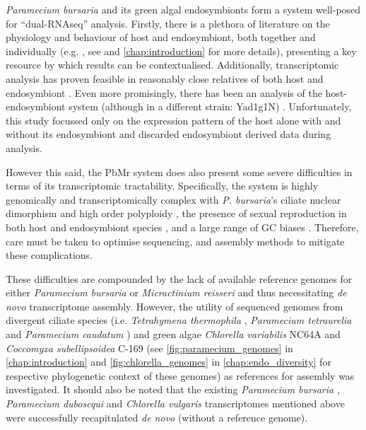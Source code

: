 \textit{Paramecium bursaria} and its green algal endosymbionts form a system well-posed
for ``dual-RNAseq'' analysis.  Firstly, there is a plethora 
of literature on the physiology and behaviour of host and endosymbiont, both together and individually
(e.g. \citep{Iwatsuki1988}, see \citep{Kato2009a} and \ref{chap:introduction} for more details), presenting 
a key resource by which results can be contextualised.
Additionally, transcriptomic analysis has proven feasible in reasonably close relatives of both host \citep{Arnaiz2010,Kolisko2014} and endosymbiont \citep{Guarnieri2011,Rowe2014,Bashan2015}.  
Even more promisingly, there has been an analysis of the host-endosymbiont
system (although in a different strain: Yad1g1N) \citep{Kodama2014}. 
Unfortunately, this study focussed only on the expression pattern of the host
alone with and without its endosymbiont and discarded endosymbiont derived data
during analysis.


However this said, the PbMr system does also present some severe difficulties in terms of its transcriptomic tractability.
Specifically, the system is highly genomically and transcriptomically complex with \textit{P. bursaria}'s ciliate nuclear
dimorphism and high order polyploidy \citep{Raikov1995}, 
the presence of sexual reproduction in both host \citep{Jennings1939} and endosymbiont species \citep{Blanc2010},
and a large range of GC biases \citep{Kodama2014}. Therefore, care must be taken to optimise sequencing,
and assembly methods to mitigate these complications.


These difficulties are compounded by the lack of available reference genomes for either \textit{Paramecium bursaria} or \textit{Micractinium reisseri} and thus necessitating \textit{de novo} transcriptome assembly.
However, the utility of sequenced genomes from divergent ciliate species 
(i.e. \textit{Tetrahymena thermophila} \citep{Eisen2006}, \textit{Paramecium tetraurelia} \citep{Aury2006} and \textit{Paramecium caudatum}
\citep{McGrath2014}) and green algae \textit{Chlorella variabilis} NC64A \citep{Blanc2010} and \textit{Coccomyxa subellipsoidea} C-169 \citep{Blanc2012}
(see \ref{fig:paramecium_genomes} in \ref{chap:introduction} and \ref{fig:chlorella_genomes} in \ref{chap:endo_diversity} for respective phylogenetic context of these genomes) as references for assembly was investigated.
It should also be noted that the existing \textit{Paramecium bursaria} \citep{Kodama2014}, 
\textit{Paramecium duboscqui} \citep{Kolisko2014} and
\textit{Chlorella vulgaris} \citep{Guarnieri2011} transcriptomes mentioned above were
successfully recapitulated \textit{de novo} (without a reference genome).


